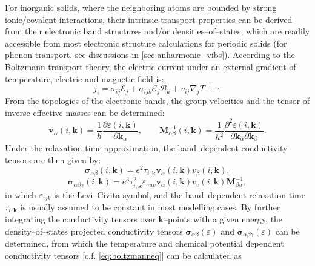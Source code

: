 For inorganic solids, where the neighboring atoms are bounded by strong ionic/covalent interactions, their intrinsic  transport properties can be derived from their electronic band structures and/or densities--of--states,\cite{madsen2006boltztrap} which are readily accessible from most electronic structure calculations for periodic solids (for phonon transport, see discussions in  \cref{sec:anharmonic_vibs}). According to the Boltzmann transport theory, the electric current under an external gradient of temperature, electric and magnetic field is:
\begin{equation}\label{eq:boltzmanneq}
    j_i=\sigma_{ij}\bm{\mathcal{E}}_{j}+\sigma_{ijk}\bm{\mathcal{E}}_{j}\bm{\mathcal{B}}_{k}+v_{ij}\nabla_j T+\cdots
\end{equation}
From the topologies of the electronic bands, the group velocities and the tensor of inverse effective masses can be determined:
\begin{equation*}
    \bm{v}_\alpha(i,\bm{k})=\frac{1}{\hbar}\frac{\partial \varepsilon(i,\bm{k})}{\partial \bm{k}_{\alpha}}, \qquad \bm{M}^{-1}_{\alpha\beta}(i,\bm{k})=\frac{1}{\hbar^2}\frac{\partial^2 \varepsilon(i,\bm{k})}{\partial \bm{k}_{\alpha}\partial \bm{k}_\beta}.
\end{equation*}
Under the relaxation time approximation, the band--dependent conductivity tensors are then given by: 
\begin{equation}
\label{eq:e_cond_tensor}
    \bm{\sigma}_{\alpha\beta}(i,\bm{k})=e^2\tau_{i,\bm{k}}\bm{v}_\alpha(i,\bm{k})v_\beta(i,\bm{k}),
\end{equation}
\begin{equation}
\label{eq:hall_cond_tensor}
    \bm{\sigma}_{\alpha\beta\gamma}(i,\bm{k})=e^3\tau_{i,\bm{k}}^2\varepsilon_{\gamma uv}\bm{v}_\alpha(i,\bm{k})v_v(i,\bm{k})\bm{M}^{-1}_{\beta u},
\end{equation}
in which $\varepsilon_{ijk}$ is  the Levi--Civita symbol, and the band--dependent relaxation time $\tau_{i,\bm{k}}$ is usually assumed to be constant in most modelling cases. By further integrating the conductivity tensors over $\bm{k}$--points with a given energy, the density--of--states projected conductivity tensors $\bm{\sigma}_{\alpha\beta}(\varepsilon)$ and $\bm{\sigma}_{\alpha\beta\gamma}(\varepsilon)$ can be determined, from which the temperature and chemical potential dependent conductivity tensors [c.f. \cref{eq:boltzmanneq}] can be calculated as
